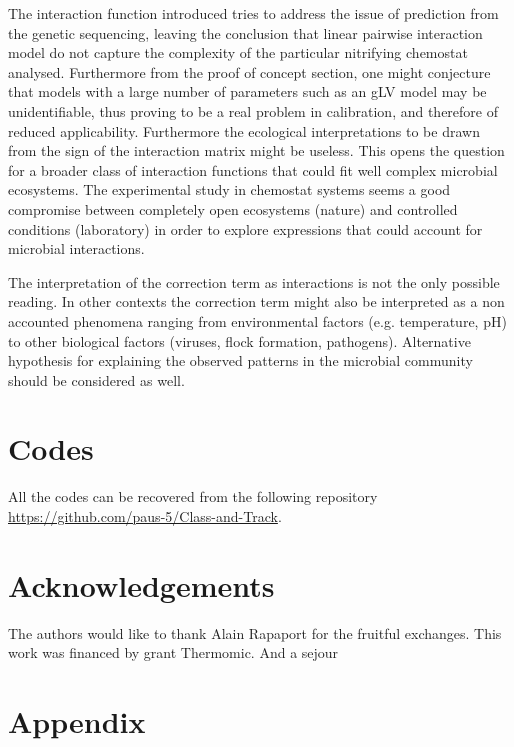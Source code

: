 \documentclass[3p,times]{elsarticle}
\begin{document}
The interaction function introduced tries to address the issue of prediction from the genetic sequencing, leaving the conclusion that linear pairwise interaction model do not capture the complexity of the particular nitrifying chemostat analysed. Furthermore from the proof of concept section, one might conjecture that models with a large number of parameters such as an gLV model may be unidentifiable, thus proving to be a real problem in calibration, and therefore of reduced applicability. Furthermore the ecological interpretations to be drawn from the sign of the interaction matrix might be useless. This opens the question for a broader class of interaction functions that could fit well complex microbial ecosystems. The experimental study in chemostat systems seems a good compromise between completely open ecosystems (nature) and controlled conditions (laboratory) in order to explore expressions that could account for microbial interactions.

The interpretation of the correction term as interactions is not the only possible reading. In other contexts the correction term might also be interpreted as a non accounted phenomena ranging from environmental factors (e.g. temperature, pH) to other biological factors (viruses, flock formation, pathogens). Alternative hypothesis for explaining the observed patterns in the microbial community should be considered as well.  

\section{Codes}

All the codes can be recovered from the following repository \url{https://github.com/paus-5/Class-and-Track}.
\section{Acknowledgements}
 The authors would like to thank Alain Rapaport for the fruitful exchanges. This work was financed by grant Thermomic. And a sejour 

\section{Appendix}
\end{document}
